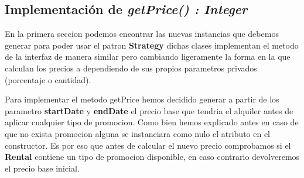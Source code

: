 \subsection{Implementación de \textit{getPrice() : Integer}}
\par
En la primera seccion podemos encontrar las nuevas instancias que debemos generar para poder usar el patron \textbf{Strategy} dichas clases implementan el metodo de la interfaz
de manera similar pero cambiando ligeramente la forma en la que calculan los precios a dependiendo de sus propios parametros privados (porcentaje o cantidad).\par
\vspace{0.15cm}
Para implementar el metodo getPrice hemos decidido generar a partir de los parametro \textbf{startDate} y \textbf{endDate} el precio base que tendria el alquiler antes de aplicar 
cualquier tipo de promocion. Como bien hemos explicado antes en caso de que no exista promocion alguna se instanciara como nulo el atributo en el constructor. Es por eso que 
antes de calcular el nuevo precio comprobamos si el \textbf{Rental} contiene un tipo de promocion disponible, en caso contrario devolveremos el precio base inicial.
\newpage
